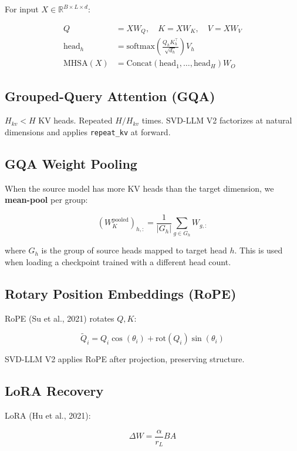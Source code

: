 For input $X \in \mathbb{R}^{B \times L \times d}$:

\[
\begin{aligned}
Q &= X W_Q, \quad K = X W_K, \quad V = X W_V \\
\text{head}_h &= \text{softmax}\!\left(\frac{Q_h K_h^\top}{\sqrt{d_h}}\right) V_h \\
\text{MHSA}(X) &= \text{Concat}(\text{head}_1, \dots, \text{head}_H) W_O
\end{aligned}
\tag{3.8}
\]

\subsection{Grouped-Query Attention (GQA)}

$H_{kv} < H$ KV heads. Repeated $H / H_{kv}$ times. SVD-LLM V2 factorizes at 
natural dimensions and applies \texttt{repeat\_kv} at forward.

\subsection{GQA Weight Pooling}

When the source model has more KV heads than the target dimension, we 
\textbf{mean-pool} per group:

\[
(W_K^{\text{pooled}})_{h, :} = \frac{1}{|G_h|} \sum_{g \in G_h} W_{g, :}
\tag{3.9}
\]

where $G_h$ is the group of source heads mapped to target head $h$. This is 
used when loading a checkpoint trained with a different head count.

\subsection{Rotary Position Embeddings (RoPE)}

RoPE (Su et al., 2021) rotates $Q, K$:

\[
\tilde{Q}_i = Q_i \cos(\theta_i) + \text{rot}(Q_i) \sin(\theta_i)
\tag{3.10}
\]

SVD-LLM V2 applies RoPE after projection, preserving structure.

\subsection{LoRA Recovery}

LoRA (Hu et al., 2021):

\[
\Delta W = \frac{\alpha}{r_L} B A
\tag{3.11}
\]

